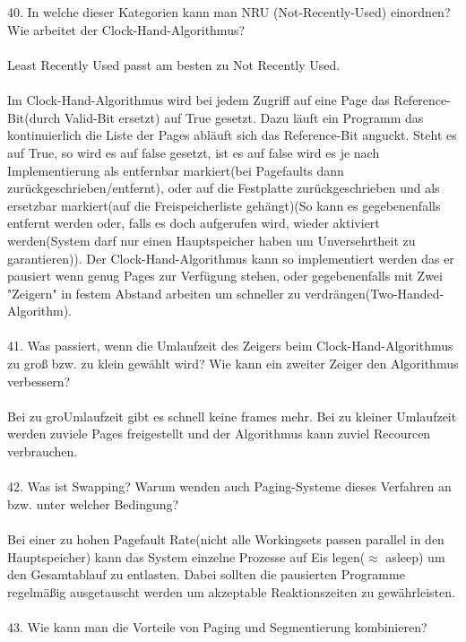 \documentclass{article}
\begin{document}
\\
\\
40. In welche dieser Kategorien kann man NRU (Not-Recently-Used) einordnen? Wie arbeitet
der Clock-Hand-Algorithmus?
\\
\\
Least Recently Used passt am besten zu Not Recently Used.
\\
\\
Im Clock-Hand-Algorithmus wird bei jedem Zugriff auf eine Page das Reference-Bit(durch Valid-Bit ersetzt) auf True gesetzt. Dazu l\"auft ein Programm das kontinuierlich die Liste der Pages abl\"auft sich das Reference-Bit anguckt. Steht es auf True, so wird es auf false gesetzt, ist es auf false wird es je nach Implementierung als entfernbar markiert(bei Pagefaults dann zur\"uckgeschrieben/entfernt), oder auf die Festplatte zur\"uckgeschrieben und als ersetzbar markiert(auf die Freispeicherliste geh\"angt)(So kann es gegebenenfalls entfernt werden oder, falls es doch aufgerufen wird, wieder aktiviert werden(System darf nur einen Hauptspeicher haben um Unversehrtheit zu garantieren)).
Der Clock-Hand-Algorithmus kann so implementiert werden das er pausiert wenn genug Pages zur Verf\"ugung stehen, oder gegebenenfalls mit Zwei "Zeigern" in festem Abstand arbeiten um schneller zu verdr\"angen(Two-Handed-Algorithm).
\\
\\
41. Was passiert, wenn die Umlaufzeit des Zeigers beim Clock-Hand-Algorithmus zu groß bzw.
zu klein gewählt wird? Wie kann ein zweiter Zeiger den Algorithmus verbessern?
\\
\\
Bei zu gro\sser Umlaufzeit gibt es schnell keine frames mehr. Bei zu kleiner Umlaufzeit werden zuviele Pages freigestellt und der Algorithmus kann zuviel Recourcen verbrauchen.
\\
\\
42. Was ist Swapping? Warum wenden auch Paging-Systeme dieses Verfahren an bzw. unter
welcher Bedingung?
\\
\\
Bei einer zu hohen Pagefault Rate(nicht alle Workingsets passen parallel in den Hauptspeicher) kann das System einzelne Prozesse auf Eis legen($\approx$ asleep) um den Gesamtablauf zu entlasten. Dabei sollten die pausierten Programme regelm\"a\ss ig ausgetauscht werden um akzeptable Reaktionszeiten zu gew\"ahrleisten.
\\
\\
43. Wie kann man die Vorteile von Paging und Segmentierung kombinieren?
\end{document}
